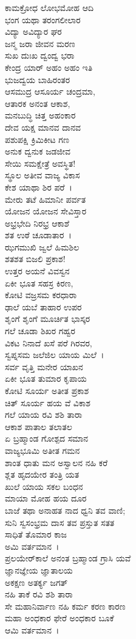  ಕಾಮಕ್ರೋಧ ಲೋಭಮೋಹ ಆದಿ\\ಭಂಗ ಯಥಾ ತರಂಗಲೀಲಾರ\\ವಿದ್ಯಾ ಅವಿದ್ಯಾರ ಘರ\\ಜನ್ಮ ಜರಾ ಜೀವನ ಮರಣ\\ಸುಖ ದುಃಖ ದ್ವಂದ್ವ ಭರಾ\\ಕೇಂದ್ರ ಯಾರ್ ಅಹಂ ಅಹಂ ಇತಿ\\ಭುಜದ್ವಯ ಬಾಹಿರಂತರ\\ಆಸಮುದ್ರ ಆಸೂರ್ಯ ಚಂದ್ರಮಾ,\\ಆತಾರಕ ಅನಂತ ಆಕಾಶ,\\ಮನಬುದ್ಧಿ ಚಿತ್ತ ಅಹಂಕಾರ\\ದೇವ ಯಕ್ಷ ಮಾನವ ದಾನವ\\ಪಶುಪಕ್ಷಿ ಕ್ರಿಮಿಕೀಟ ಗಣ\\ಅನುಕ ದ್ವನುಕ ಜಡಜೀವ\\ಸೇಯಿ ಸಮಕ್ಷೇತ್ರೆ ಅವಸ್ಥಿತ!\\ಸ್ಥೂಲ ಅತೀವ ವಾಜ್ಯ ವಿಕಾಸ\\ಕೇಶ ಯಾಥಾ ಶಿರ ಪರೆ~।\\ಮೇರು ತಟೆ ಹಿಮಾನೀ ಪರ್ವತ\\ಯೋಜನ ಯೋಜನ ಸೇವಿಸ್ತಾರ\\ಅಭ್ರಭೇದಿ ನಿರಭ್ರ ಆಕಾಶೆ\\ಶತ ಉಠೆ ಚೂಡಾತಾರ~।\\
 ಝಗಮುಖಿ ಜ್ವಲೆ ಹಿಮಶಿಲ\\ಶತಶತ ಬಿಜಲಿ ಪ್ರಕಾಶ!\\ಉತ್ತರ ಅಯನೆ ವಿವಸ್ವನ\\ಏಕೀ ಭೂತ ಸಹಸ್ರ ಕಿರಣ,\\ಕೋಟಿ ವಜ್ರಸಮ ಕರಧಾರಾ\\ಢಾಲೆ ಯಬೆ ತಾಹಾರ ಉಪರ\\ಶೃಂಗೆ ಶೃಂಗೆ ಮೂರ್ಚಿತ ಭಾಸ್ಕರ\\ಗಲೆ ಚೂಡಾ ಶಿಖರ ಗಹ್ವರ\\ವಿಕಟ ನಿನಾದೆ ಖಸೆ ಪರೆ ಗಿರವರ,\\ಸ್ವಪ್ನಸಮ ಜಲೆಜಿಲ ಯಾಯ ಮಿಲೆ~।\\
 ಸರ್ವ ವೃತ್ತಿ ಮನೇರ ಯಾಖನ\\ಏಕೀ ಭೂತ ತುಮಾರ ಕೃಪಾಯ\\ಕೋಟಿ ಸೂರ್ಯ ಅತೀತ ಪ್ರಕಾಶ\\ಚಿತ್ ಸೂರ್ಯ ಹಯ ವೆ ವಿಕಾಶ\\ಗಲೆ ಯಾಯ ರವಿ ಶಶಿ ತಾರಾ\\ಆಕಾಶ ಪಾತಾಲ ತಲಾತಲ\\ಏ ಬ್ರಹ್ಮಾಂಡ ಗೋಶ್ಪದ ಸಮಾನ\\ವಾಜ್ಯಭೂಮಿ ಅತೀತ ಗಮನ\\ಶಾಂತ ಧಾತು ಮನ ಅಸ್ವಾಲನ ನಹಿ ಕರೆ\\ಶ್ಲತ ಹೃದಯೇರ ತಂತ್ರಿ ಯತ\\ಖುಲೆ ಯಾಯ ಸಕಲ ಬಂಧನ\\ಮಾಯಾ ಮೋಹ ಹಯ ದೂರ\\ಬಾಜೆ ತಥಾ ಅನಾಹತ ನಾದ ಧ್ವನಿ ತವ ವಾಣಿ;\\ಸುನಿ ಸ್ವಸಂಭ್ರಮ ದಾಸ ತವ ಪ್ರಸ್ತುತ ಸತತ\\ಸಾಧಿತೆ ತೊಮಾರ ಕಾಜ\\ಅಮಿ ವರ್ತಮಾನ~।\\ಪ್ರಲಯೇರ್‌ಕಾಲೆ ಅನಂತ ಬ್ರಹ್ಮಾಂಡ ಗ್ರಾಸಿ ಯವೆ\\ಜ್ಞಾನಜ್ಞೇಯ ಜ್ಞಾತಾಲಯ\\ಅಕಕ್ಷಣ ಅತರ್ಕ್ಯ ಜಗತ್\\ನಹಿ ತಾಕೆ ರವಿ ಶಶಿ ತಾರಾ\\ಸೇ ಮಹಾನಿರ್ವಾಣ ನಹಿ ಕರ್ಮ ಕರಣ ಕಾರಣ\\ಮಹಾ ಅಂಧಕಾರ ಫೇರೆ ಅಂಧಕಾರ ಬೂಕೆ\\ಆಮಿ ವರ್ತಮಾನ~।\\
